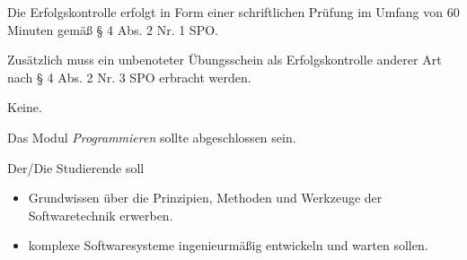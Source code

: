 \begin{course}

\setdoclanguagegerman
{}



\coursehead


\label{cour_7119.dp_997}


\begin{styleenv}
\begin{assessment}
Die Erfolgskontrolle erfolgt in Form einer schriftlichen Prüfung im Umfang von 60 Minuten gemäß § 4 Abs. 2 Nr. 1 SPO.

 

Zusätzlich muss ein unbenoteter Übungsschein als Erfolgskontrolle anderer Art nach § 4 Abs. 2 Nr. 3 SPO erbracht werden.


\end{assessment}

\begin{conditions}Keine.\end{conditions}

\begin{recommendations}Das Modul \emph{Programmieren} sollte abgeschlossen sein.

\end{recommendations}
\end{styleenv}

\begin{learningoutcomes}
Der/Die Studierende soll

 \begin{itemize}\item Grundwissen über die Prinzipien, Methoden und Werkzeuge der Softwaretechnik erwerben.  \item komplexe Softwaresysteme ingenieurmäßig entwickeln und warten sollen.  \end{itemize}
\end{learningoutcomes}


\end{course}
